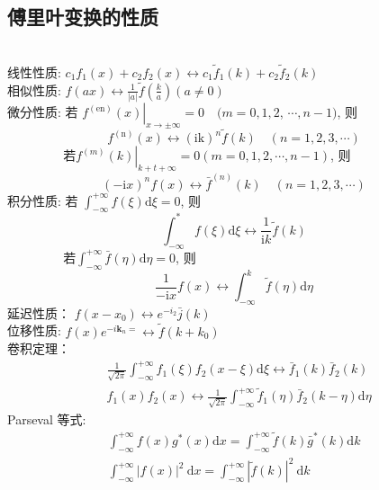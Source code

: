 \subsection{傅里叶变换的性质}
~~\\
线性性质: $\displaystyle c_1 f_1(x)+c_2 f_2(x) \longleftrightarrow c_1 \tilde{f}_1(k)+c_2 \tilde{f}_2(k)$\\
相似性质: $\displaystyle f(a x) \longleftrightarrow \frac{1}{|a|} \tilde{f}\left(\frac{k}{a}\right)(a \neq 0)$\\
微分性质: 若 $\displaystyle \left.f^{(\mathrm{en})}(x)\right|_{x \rightarrow \pm \infty}=0 \quad(m=0,1,2$,
$\cdots, n-1)$, 则
$$
f^{(\mathrm{n})}(x) \longleftrightarrow(\mathrm{ik})^n \tilde{f}(k) \quad(n=1,2,3, \cdots)
$$
$~~\qquad\qquad \text{若} \displaystyle \left.f^{(m)}(k)\right|_{k+t+\infty}=0(m=0,1,2, \cdots, n-1)$, 则
$$
(-\mathrm{i} x)^n f(x) \longleftrightarrow \bar{f}^{(n)}(k) \quad(n=1,2,3, \cdots)
$$
积分性质: 若 $\displaystyle \int_{-\infty}^{+\infty} f(\xi) \mathrm{d} \xi=0$, 则
$$
\int_{-\infty}^* f(\xi) \mathrm{d} \xi \longleftrightarrow \frac{1}{\mathrm{i} k} \tilde{f}(k)
$$
$~~\qquad\qquad \text{若} \displaystyle \int_{-\infty}^{+\infty} \bar{f}(\eta) \mathrm{d} \eta=0$, 则
$$
\frac{1}{-\mathrm{i} x} f(x) \longleftrightarrow \int_{-\infty}^k \tilde{f}(\eta) \mathrm{d} \eta
$$
延迟性质： $\displaystyle f\left(x-x_0\right) \longleftrightarrow e^{-i_2} \bar{j}(k)$\\
位移性质: $\displaystyle f(x) e^{-i \mathbf{k}_n=} \longleftrightarrow \tilde{f}\left(k+k_0\right)$\\
卷积定理：
$$
\begin{aligned}
& \frac{1}{\sqrt{2 \pi}} \int_{-\infty}^{+\infty} f_1(\xi) f_2(x-\xi) \mathrm{d} \xi \longleftrightarrow \bar{f}_1(k) \bar{f}_2(k) \\
& f_1(x) f_2(x) \longleftrightarrow \frac{1}{\sqrt{2 \pi}} \int_{-\infty}^{+\infty} \tilde{f}_1(\eta) \bar{f}_2(k-\eta) \mathrm{d} \eta
\end{aligned}
$$
Parseval 等式:
$$
\begin{gathered}
\int_{-\infty}^{+\infty} f(x) g^*(x) \mathrm{d} x=\int_{-\infty}^{+\infty} \tilde{f}(k) \bar{g}^*(k) \mathrm{d} k \\
\int_{-\infty}^{+\infty}|f(x)|^2 \mathrm{~d} x=\int_{-\infty}^{+\infty}|\tilde{f}(k)|^2 \mathrm{~d} k
\end{gathered}
$$
~~\\ 

